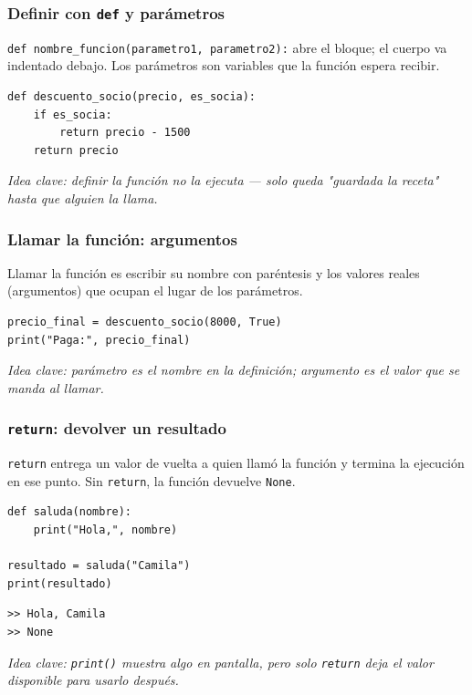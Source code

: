 \documentclass[11pt]{article}
\begin{document}
\subsubsection*{Definir con \texttt{def} y parámetros}
\texttt{def nombre\_funcion(parametro1, parametro2):} abre el bloque; el cuerpo va indentado debajo. Los parámetros son variables que la función espera recibir.

\begin{cajacodigo}
\begin{Verbatim}[fontsize=\small]
def descuento_socio(precio, es_socia):
    if es_socia:
        return precio - 1500
    return precio
\end{Verbatim}
\end{cajacodigo}
\textit{Idea clave: definir la función no la ejecuta --- solo queda "guardada la receta" hasta que alguien la llama.}

\subsubsection*{Llamar la función: argumentos}
Llamar la función es escribir su nombre con paréntesis y los valores reales (argumentos) que ocupan el lugar de los parámetros.

\begin{cajacodigo}
\begin{Verbatim}[fontsize=\small]
precio_final = descuento_socio(8000, True)
print("Paga:", precio_final)
\end{Verbatim}
\end{cajacodigo}
\textit{Idea clave: parámetro es el nombre en la definición; argumento es el valor que se manda al llamar.}

\subsubsection*{\texttt{return}: devolver un resultado}
\texttt{return} entrega un valor de vuelta a quien llamó la función y termina la ejecución en ese punto. Sin \texttt{return}, la función devuelve \texttt{None}.

\begin{cajacodigo}
\begin{Verbatim}[fontsize=\small]
def saluda(nombre):
    print("Hola,", nombre)

resultado = saluda("Camila")
print(resultado)
\end{Verbatim}
\end{cajacodigo}
\begin{cajacodigo}
\begin{Verbatim}[fontsize=\small]
>> Hola, Camila
>> None
\end{Verbatim}
\end{cajacodigo}
\textit{Idea clave: \texttt{print()} muestra algo en pantalla, pero solo \texttt{return} deja el valor disponible para usarlo después.}
\end{document}
